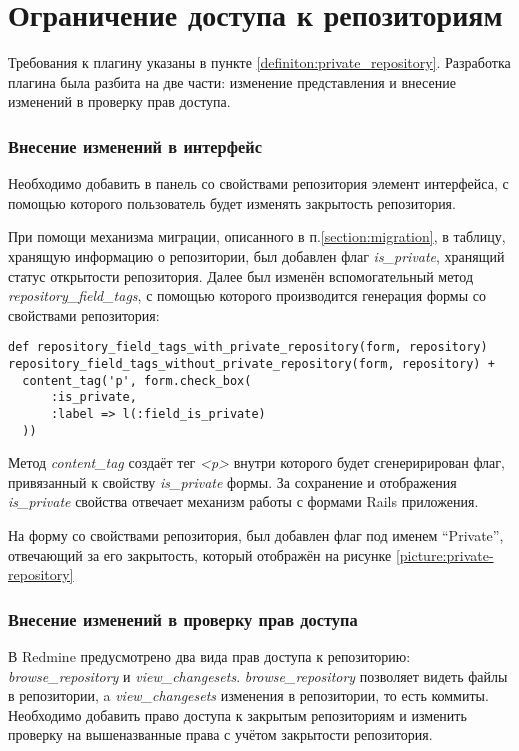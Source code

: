 \section{Ограничение доступа к репозиториям}
Требования к плагину указаны в пункте \ref{definiton:private_repository}.
Разработка плагина была разбита на две части: изменение представления и
внесение изменений в проверку прав доступа.

\subsubsection{Внесение изменений в интерфейс}
Необходимо добавить в панель со свойствами репозитория элемент интерфейса,
с помощью которого пользователь будет изменять закрытость репозитория.

При помощи механизма миграции, описанного в п.\ref{section:migration}, в
таблицу, хранящую информацию о репозитории, был добавлен флаг
\textit{is\_private}, хранящий статус открытости репозитория. Далее был изменён
вспомогательный метод \textit{repository\_field\_tags}, с помощью которого
производится генерация формы со свойствами репозитория:
\small{\begin{lstlisting}
def repository_field_tags_with_private_repository(form, repository)
repository_field_tags_without_private_repository(form, repository) +
  content_tag('p', form.check_box(
      :is_private,
      :label => l(:field_is_private)
  ))
\end{lstlisting}}
Метод \textit{content\_tag} создаёт тег \textit{<p>} внутри которого будет
сгенеририрован флаг, привязанный к свойству \textit{is\_private} формы.
За сохранение и отображения \textit{is\_private} свойства отвечает механизм
работы с формами Rails приложения.

На форму со свойствами репозитория, был добавлен флаг под именем ``Private'',
отвечающий за его закрытость, который отображён на рисунке
\ref{picture:private-repository}

\subsubsection{Внесение изменений в проверку прав доступа}
В Redmine предусмотрено два вида прав доступа к репозиторию:
\textit{browse\_repository} и \textit{view\_changesets}.
\textit{browse\_repository} позволяет видеть файлы в репозитории, a
\textit{view\_changesets} изменения в репозитории, то есть коммиты. 
Необходимо добавить право доступа к закрытым репозиториям и изменить проверку
на вышеназванные права с учётом закрытости репозитория.

